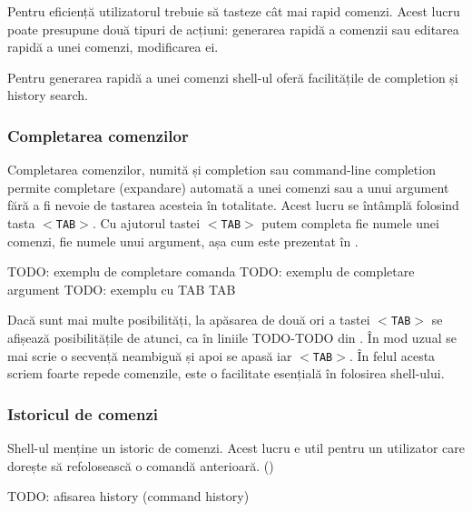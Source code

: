 Pentru eficiență utilizatorul trebuie să tasteze cât mai rapid comenzi. Acest
lucru poate presupune două tipuri de acțiuni: generarea rapidă a comenzii sau
editarea rapidă a unei comenzi, modificarea ei.

Pentru generarea rapidă a unei comenzi shell-ul oferă facilitățile de completion
și history search.

\subsubsection{Completarea comenzilor}
\label{sec:cli-completion}

Completarea comenzilor, numită și completion sau command-line completion permite
completare (expandare) automată a unei comenzi sau a unui argument fără a fi
nevoie de tastarea acesteia în totalitate. Acest lucru se întâmplă folosind
tasta \texttt{$<$TAB$>$}. Cu ajutorul tastei \texttt{$<$TAB$>$} putem completa fie numele unei comenzi, fie numele unui argument, așa cum este prezentat în .

\begin{screen}[caption={Completarea comenzilor},label={lst:cli:tab-completion}]
TODO: exemplu de completare comanda
TODO: exemplu de completare argument
TODO: exemplu cu TAB TAB
\end{screen}

Dacă sunt mai multe posibilități, la apăsarea de două ori a tastei \texttt{$<$TAB$>$} se
afișează posibilitățile de atunci, ca în liniile TODO-TODO din . În mod uzual se mai scrie o secvență
neambiguă și apoi se apasă iar \texttt{$<$TAB$>$}. În felul acesta scriem foarte repede
comenzile, este o facilitate esențială în folosirea shell-ului.

\subsubsection{Istoricul de comenzi}
\label{sec:cli-history}

Shell-ul menține un istoric de comenzi. Acest lucru e util pentru un utilizator
care dorește să refolosească o comandă anterioară. ()

\begin{screen}[caption={Afișarea istoricului de comenzi},label={lst:cli:show-history}]
TODO: afisarea history (command history)
\end{screen}

